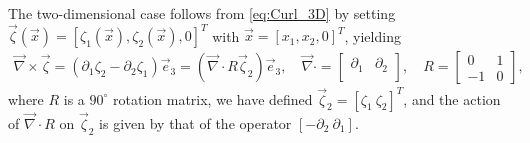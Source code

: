 \documentclass{cmslatex}
\begin{document}
The two-dimensional case 
follows from \eqref{eq:Curl_3D} by setting
$\vec{\zeta}(\vec{x})=[\zeta_1(\vec{x}),\zeta_2(\vec{x}),0]^T$ with
$\vec{x}=[x_1,x_2,0]^T$, yielding   
%
\begin{align}\label{eq:Curl_2D}
  \vec{\nabla}\times\vec{\zeta}=(\partial_1\zeta_2-\partial_2\zeta_1)\vec{e}_3
%  
%  
  =(\vec{\nabla}\cdot R\vec{\zeta}_2)\vec{e}_3,
%
  \quad
%  
  \vec{\nabla}\cdot
    =\left[
    \begin{array}{ccc}
       \partial_1  &   \partial_2 \\      
    \end{array}
  \right],
  \quad
  R=
  \left[
    \begin{array}{ccc}
        0  &  1  \\
       -1  &  0  
    \end{array}
  \right],
\end{align}
%
where $R$ is a $90^\circ$ rotation matrix, we have defined $\vec{\zeta}_2=[\zeta_1
\ \zeta_2]^T$, and the action of $\vec{\nabla}\cdot R$ on $\vec{\zeta}_2$ is given by that
of the operator $[ - \partial_2 \ \partial_1]$.
\end{document}
